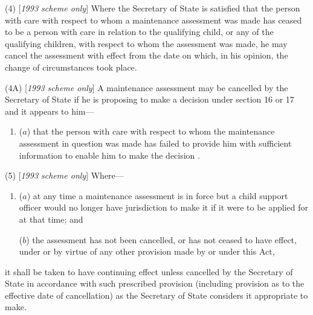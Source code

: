 \documentclass[12pt,a4paper]{article}
\begin{document}
(4) [\emph{1993 scheme only}] Where 
the Secretary of State  %
is satisfied that the person with care with respect to whom a maintenance assessment was made has ceased to be a person with care in relation to the qualifying child, or any of the qualifying children, with respect to whom the assessment was made, he may cancel the assessment with effect from the date on which, in his opinion, the change of circumstances took place.

(4A) [\emph{1993 scheme only}] A maintenance assessment may be cancelled by 
the Secretary of State  %
if he is 
proposing to make a decision under section 16 or 17  %
and it appears to him—
\begin{enumerate}\item[]
($a$) that the person with care with respect to whom the maintenance assessment in question was made has failed to provide him with sufficient information to enable him to 
make the decision%
%
.
\end{enumerate}

(5) [\emph{1993 scheme only}] Where—
\begin{enumerate}\item[]
($a$) at any time a maintenance assessment is in force but a child support officer would no longer have jurisdiction to make it if it were to be applied for at that time; and

($b$) the assessment has not been cancelled, or has not ceased to have effect, under or by virtue of any other provision made by or under this Act,
\end{enumerate}
it shall be taken to have continuing effect unless cancelled by 
the Secretary of State  %
in accordance with such prescribed provision (including provision as to the effective date of cancellation) as the Secretary of State considers it appropriate to make.
\end{document}
